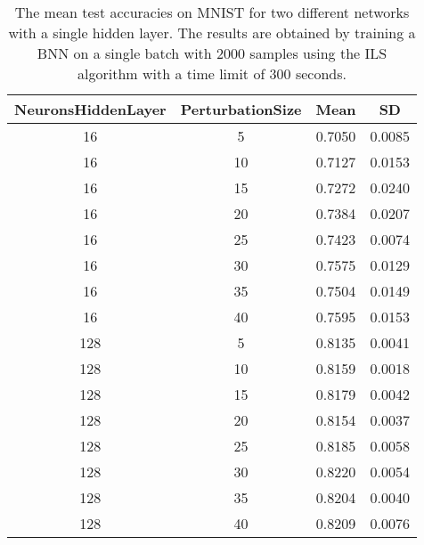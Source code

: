 \begin{center}
\begin{table}[H]
\centering
\begin{tabular}{|c|c|c|c|}
  \hline
NeuronsHiddenLayer & PerturbationSize & Mean & SD \\ 
  \hline
16 &     5 & 0.7050 & 0.0085 \\ 
   \hline
16 &    10 & 0.7127 & 0.0153 \\ 
   \hline
16 &    15 & 0.7272 & 0.0240 \\ 
   \hline
16 &    20 & 0.7384 & 0.0207 \\ 
   \hline
16 &    25 & 0.7423 & 0.0074 \\ 
   \hline
16 &    30 & 0.7575 & 0.0129 \\ 
   \hline
16 &    35 & 0.7504 & 0.0149 \\ 
   \hline
16 &    40 & 0.7595 & 0.0153 \\ 
   \hline
128 &     5 & 0.8135 & 0.0041 \\ 
   \hline
128 &    10 & 0.8159 & 0.0018 \\ 
   \hline
128 &    15 & 0.8179 & 0.0042 \\ 
   \hline
128 &    20 & 0.8154 & 0.0037 \\ 
   \hline
128 &    25 & 0.8185 & 0.0058 \\ 
   \hline
128 &    30 & 0.8220 & 0.0054 \\ 
   \hline
128 &    35 & 0.8204 & 0.0040 \\ 
   \hline
128 &    40 & 0.8209 & 0.0076 \\ 
   \hline
\end{tabular}
\caption{The mean test accuracies on MNIST for two different networks with a single hidden layer.
            The results are obtained by training a BNN on a single batch with 2000 samples using the ILS
            algorithm with a time limit of 300 seconds. } 
\label{SBT_FTPS}
\end{table}

\end{center}
